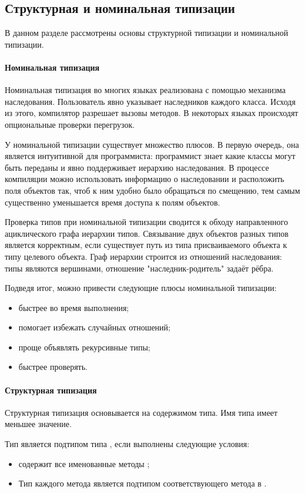 \subsection{Структурная и номинальная типизации}
В данном разделе рассмотрены основы структурной типизации и номинальной типизации.

\paragraph{Номинальная типизация}
Номинальная типизация во многих языках реализована с помощью механизма наследования\cite{book:pierce}. Пользователь явно указывает наследников каждого класса. Исходя из этого, компилятор разрешает вызовы методов. В некоторых языках происходят опциональные проверки перегрузок.

У номинальной типизации существует множество плюсов. В первую очередь, она является интуитивной для программиста: программист знает какие классы могут быть переданы и явно поддерживает иерархию наследования. В процессе компиляции можно использовать информацию о наследовании и расположить поля объектов так, чтоб к ним удобно было обращаться по смещению, тем самым существенно уменьшается время доступа к полям объектов.

Проверка типов при номинальной типизации сводится к обходу направленного ациклического графа иерархии типов. Связывание двух объектов разных типов является корректным, если существует путь из типа присваиваемого объекта к типу целевого объекта. Граф иерархии строится из отношений наследования: типы являются вершинами, отношение "наследник-родитель" задаёт рёбра.

Подведя итог, можно привести следующие плюсы номинальной типизации:
\begin{itemize}
    \item быстрее во время выполнения;
    \item помогает избежать случайных отношений;
    \item проще объявлять рекурсивные типы;
    \item быстрее проверять.
\end{itemize}

\paragraph{Структурная типизация}
Структурная типизация основывается на содержимом типа\cite{book:pierce}. Имя типа имеет меньшее значение.

Тип  является подтипом типа , если выполнены следующие условия:
\begin{itemize}
    \item {} содержит все именованные методы ;
    \item Тип каждого метода  является подтипом соответствующего метода в .
\end{itemize}

